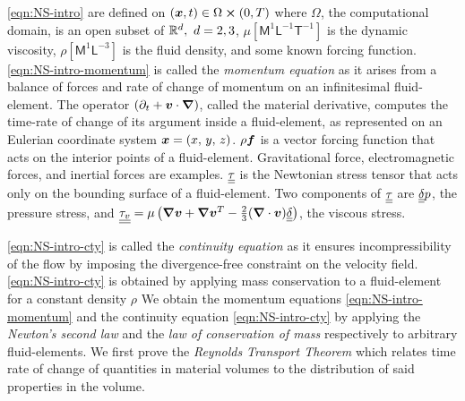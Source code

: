 \autoref{eqn:NS-intro} are defined on $(\boldsymbol{x},t)\in\Omega\cross(0,T)$ where $\Omega$, the computational domain, is an open subset of $\mathbb{R}^d,\ d=2,3$, $\mu \left[\textsf{M}^{1} \textsf{L}^{-1} \textsf{T}^{-1} \right]$ is the dynamic viscosity, $\rho \left[\textsf{M}^{1} \textsf{L}^{-3}\right]$ is the fluid density, and  some known forcing function. \autoref{eqn:NS-intro-momentum} is called the \textit{momentum equation} as it arises from a balance of forces and rate of change of momentum on an infinitesimal fluid-element.
The operator $(\partial_{t}+\boldsymbol{v}\cdot\boldsymbol{\nabla})$, called the material derivative, computes the time-rate of change of its argument inside a fluid-element, as represented on an Eulerian coordinate system $\boldsymbol{x}=(x,\,y,\,z)$.
$\rho\boldsymbol{f}$ is a vector forcing function that acts on the interior points of a fluid-element. Gravitational force, electromagnetic forces, and inertial forces are examples. $\underline{\underline{\tau}}$ is the Newtonian stress tensor that acts only on the bounding surface of a fluid-element. Two components of $\underline{\underline{\tau}}$ are $\underline{\underline{\delta}}p$, the pressure stress, and $\underline{\underline{\tau_v}} = \mu\left(\boldsymbol{\nabla}\boldsymbol{v} + \boldsymbol{\nabla}\boldsymbol{v}^T - \frac{2}{3}(\boldsymbol{\nabla}\cdot\boldsymbol{v})\underline{\underline{\delta}}\right)$, the viscous stress.

\autoref{eqn:NS-intro-cty} is called the \textit{continuity equation} as it ensures incompressibility of the flow by imposing the divergence-free constraint on the velocity field. \autoref{eqn:NS-intro-cty} is obtained by applying mass conservation to a fluid-element for a constant density $\rho$
We obtain the momentum equations \autoref{eqn:NS-intro-momentum} and the continuity equation \autoref{eqn:NS-intro-cty} by applying the \textit{Newton's second law} and the \textit{law of conservation of mass} respectively to arbitrary fluid-elements. We first prove the \textit{Reynolds Transport Theorem} which relates time rate of change of quantities in material volumes to the distribution of said properties in the volume.

